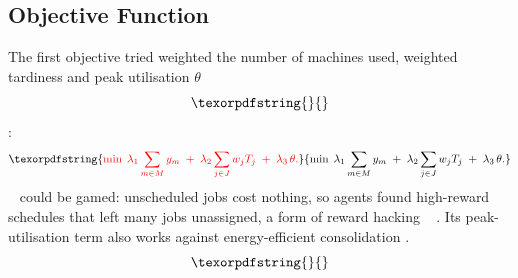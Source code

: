 \documentclass[12pt]{article}
\providecommand{\DIFaddtex}[1]{{\color{red}#1}} %
\providecommand{\DIFdeltex}[1]{} %
\providecommand{\DIFaddbegin}{} %
\providecommand{\DIFaddend}{} %
\providecommand{\DIFdelbegin}{} %
\providecommand{\DIFdelend}{} %
\providecommand{\DIFadd}[1]{\texorpdfstring{\DIFaddtex{#1}}{#1}} %
\providecommand{\DIFdel}[1]{\texorpdfstring{\DIFdeltex{#1}}{}} %
\providecommand{\DIFscaledelfig}{0.5}
\newlength{\DIFdelgraphicswidth} %
\newlength{\DIFdelgraphicsheight} %
\providecommand{\DIFaddincludegraphics}[2][]{{\color{blue}\fbox{\DIFOincludegraphics[#1]{#2}}}} %
\providecommand{\DIFdelincludegraphics}[2][]{%
\sbox{\DIFdelgraphicsbox}{\DIFOincludegraphics[#1]{#2}}%
\settoboxwidth{\DIFdelgraphicswidth}{\DIFdelgraphicsbox} %
\settoboxtotalheight{\DIFdelgraphicsheight}{\DIFdelgraphicsbox} %
\scalebox{\DIFscaledelfig}{%
\parbox[b]{\DIFdelgraphicswidth}{\usebox{\DIFdelgraphicsbox}\\[-\baselineskip] \rule{\DIFdelgraphicswidth}{0em}}\llap{\resizebox{\DIFdelgraphicswidth}{\DIFdelgraphicsheight}{%
\setlength{\unitlength}{\DIFdelgraphicswidth}%
\begin{picture}(1,1)%
\thicklines\linethickness{2pt} %
{\color[rgb]{1,0,0}\put(0,0){\framebox(1,1){}}}%
{\color[rgb]{1,0,0}\put(0,0){\line( 1,1){1}}}%
{\color[rgb]{1,0,0}\put(0,1){\line(1,-1){1}}}%
\end{picture}%
}\hspace*{3pt}}} %
} %
\DeclareRobustCommand{\DIFaddbegin}{\DIFOaddbegin \let\includegraphics\DIFaddincludegraphics} %
\DeclareRobustCommand{\DIFaddend}{\DIFOaddend \let\includegraphics\DIFOincludegraphics} %
\DeclareRobustCommand{\DIFdelbegin}{\DIFOdelbegin \let\includegraphics\DIFdelincludegraphics} %
\DeclareRobustCommand{\DIFdelend}{\DIFOaddend \let\includegraphics\DIFOincludegraphics} %
\begin{document}
\subsection{Objective \DIFdelbegin \DIFdel{Functions}%
\DIFdel{The objective functions are the functions we would like to optimise for. In this project, two objective functions were used. The first (v1) weighs machine count (with machine activation $y_m$)}\DIFdelend \DIFaddbegin \DIFadd{Function}}\label{sec:objectives}
\DIFadd{The first objective tried weighted the number of machines used}\DIFaddend , weighted tardiness \DIFdelbegin \DIFdel{($w_jT_j$) }\DIFdelend and peak utilisation $\theta$\DIFdelbegin \DIFdel{with objective weights $\lambda$:
}\begin{displaymath}\DIFdel{%

      \min \; \lambda_1 \sum_{m \in M} y_m \;+\; \lambda_2 \sum_{j \in J}
  w_j T_j \;+\; \lambda_3\, \theta,
  }\end{displaymath}%
\DIFdelend \DIFaddbegin \DIFadd{:
}\begin{equation}\DIFadd{\label{eq:objective-v1}
    \min \; \lambda_1 \sum_{m \in M} y_m \;+\; \lambda_2 \sum_{j \in J} w_j T_j \;+\; \lambda_3\, \theta.
}\end{equation}\DIFaddend 
\DIFdelbegin \DIFdel{Experiments under v1 revealed that the training reward was inefficient with reward hacking \mbox{%
\cite{skalse2022rewardhacking}}\hskip0pt%
, and that unscheduled jobs incurred no loss. Essentially the objective could be optimised without considering tardiness. Moreover, the machine activation and hotspot penalties were found to be weak in that the activation penalty was an unnecessary once-off penalty, and the hotspot term inadvertently went against energy metrics and provides no real help to the RL agents. This term also opposes }\DIFdelend \DIFaddbegin \DIFadd{\mbox{%
 }\hskip0pt%
could be gamed: unscheduled jobs cost nothing, so agents found high-reward schedules that left many jobs unassigned, a form of reward hacking \mbox{%
\cite{skalse2022rewardhacking}}\hskip0pt%
. Its peak-utilisation term also works against }\DIFaddend energy-efficient consolidation \cite{energyaware2012, fan2007powerprovisioning}. \DIFdelbegin \DIFdel{The revised objective (v2) is a sum of multiple metrics each weighted by $\lambda$:
}\begin{displaymath}\DIFdel{%

    \min \; J = \lambda_S \sum_{j} w_j T_j^{2}
              + \lambda_U \sum_{j} w_j U_j + \lambda_E E,
}\end{displaymath}%
\end{document}

